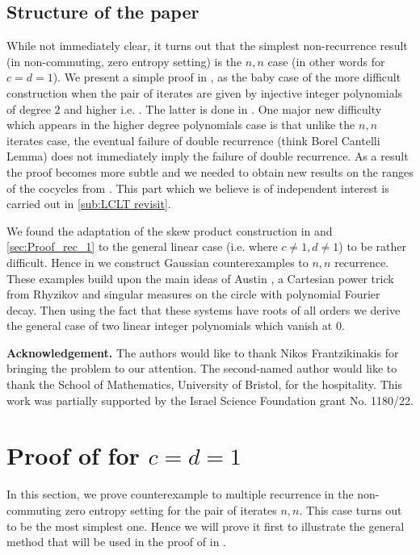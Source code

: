 \documentclass[12pt,reqno]{amsart}
\theoremstyle{definition}
\begin{document}
\subsection{Structure of the paper}
While not immediately clear, it turns out that the simplest non-recurrence result (in non-commuting, zero entropy setting) is the $n,n$ case (in other words  for $c=d=1$). We present a simple proof in , as the baby case of the more difficult construction when the pair of iterates are given by injective integer polynomials of degree $2$ and higher i.e. . The latter is done in . One major new difficulty which appears in the higher degree polynomials case is that unlike the $n,n$ iterates case, the eventual failure of double recurrence (think Borel Cantelli Lemma) does not immediately imply the failure of double recurrence. As a result the proof becomes more subtle and we needed to obtain new results on the ranges of the cocycles from \cite{kosloff_Sanadhya_2024}. This part which we believe is of independent interest is carried out in \cref{sub:LCLT revisit}. 

We found the adaptation of the skew product construction in  and \ref{sec:Proof_rec_1} to the general linear case (i.e.  where $c \neq 1,d \neq 1$) to be rather difficult. Hence in  we construct Gaussian counterexamples to $n,n$ recurrence. These examples build upon the main ideas of Austin \cite{Austin_2025}, a Cartesian power trick from Rhyzikov \cite{ryzhikov_2024_B} and singular measures on the circle with polynomial Fourier decay. Then using the fact that these systems have roots of all orders we derive the general case of two linear integer polynomials which vanish at $0$. 

{\bf Acknowledgement.} The authors would like to thank Nikos Frantzikinakis for bringing the problem to our attention. The second-named author would like to thank the School of Mathematics, University of Bristol, for the hospitality. This work was partially supported by the Israel Science Foundation grant No. 1180/22.

\section{Proof of  for $c=d=1$}\label{sec:Proof_c=d=1} In this section, we prove counterexample to multiple recurrence in the non-commuting zero entropy setting for the pair of iterates $n,n$. This case turns out to be the most simplest one. Hence we will prove it first to illustrate the general method that will be used in the proof of  in .  
\end{document}
